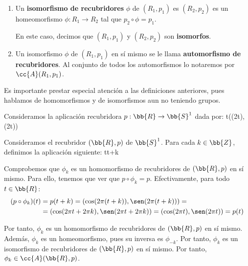 \begin{definicion}
\begin{enumerate}
        \item Un \textbf{isomorfismo de recubridores} $\phi$ de $(R_1,p_1)$ es $(R_2,p_2)$ es un homeomorfismo $\phi:R_1 \to R_2$ tal que $p_2 \circ \phi = p_1$.
        
        En este caso, decimos que $(R_1,p_1)$ y $(R_2,p_2)$ son \textbf{isomorfos}.

        \item Un isomorfismo $\phi$ de $(R_1,p_1)$ en sí mismo se le llama \textbf{automorfismo de recubridores}. Al conjunto de todos los automorfismos lo notaremos por $\cc{A}(R_1,p_1)$.
    \end{enumerate}
\end{definicion}

Es importante prestar especial atención a las definiciones anteriores, pues hablamos de homomorfismos y de isomorfismos aun no teniendo grupos.
\begin{ejemplo}
    Consideramos la aplicación recubridora $p:\bb{R}\to \bb{S}^1$ dada por:
        {t}{(\cos(2\pi t), \sen(2\pi t))}
    
    Consideramos el recubridor $(\bb{R},p)$ de $\bb{S}^1$. Para cada $k\in \bb{Z}$, definimos la aplicación siguiente:
        {t}{t+k}
    
    Comprobemos que $\phi_k$ es un homomorfismo de recubridores de $(\bb{R},p)$ en sí mismo. Para ello, tenemos que ver que $p\circ \phi_k = p$. Efectivamente, para todo $t\in \bb{R}$:
    \begin{align*}
        (p\circ \phi_k)(t) &= p(t+k) = (\cos(2\pi (t+k)), \sen(2\pi (t+k))) =\\&= (\cos(2\pi t + 2\pi k), \sen(2\pi t + 2\pi k)) = (\cos(2\pi t), \sen(2\pi t)) = p(t)
    \end{align*}

    Por tanto, $\phi_k$ es un homomorfismo de recubridores de $(\bb{R},p)$ en sí mismo. Además, $\phi_k$ es un homeomorfismo, pues su inversa es $\phi_{-k}$. Por tanto, $\phi_k$ es un isomorfismo de recubridores de $(\bb{R},p)$ en sí mismo. Por tanto, $\phi_k \in \cc{A}(\bb{R},p)$.
\end{ejemplo}
